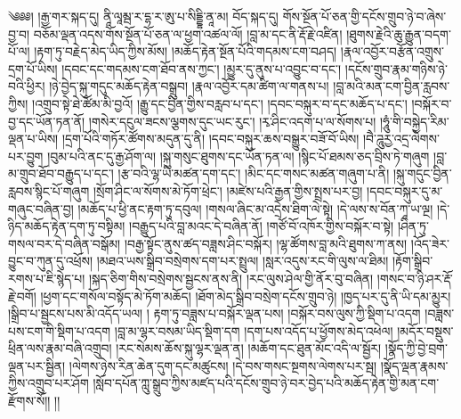 ༄༅༅། །རྒྱ་གར་སྐད་དུ། ནཱི་ལཱམྦ་ར་དྷ་ར་ཨུ་པ་སིདྡྷི་ནཱ་མ། བོད་སྐད་དུ། གོས་སྔོན་པོ་ཅན་གྱི་དངོས་གྲུབ་ཉེ་བ་ཞེས་བྱ་བ། བཅོམ་ལྡན་འདས་གོས་སྔོན་པོ་ཅན་ལ་ཕྱག་འཚལ་ལོ། །བླ་མ་དང་ནི་རྡོ་རྗེ་འཛིན། །ཐུགས་རྗེའི་ཆུ་རྒྱུན་བདག་པོ་ལ། །རྟག་ཏུ་བརྗེད་མེད་ཡིད་ཀྱིས་མོས། །མཆོད་རྟེན་སྔོན་པོའི་གདམས་ངག་བཤད། །རྣལ་འབྱོར་བརྩོན་འགྲུས་དྲག་པོ་ཡིས། །དབང་དང་གདམས་ངག་ཐོབ་ནས་ཀྱང་། །མྱུར་དུ་ནུས་པ་འབྱུང་བ་དང་། །དངོས་གྲུབ་རྣམ་གཉིས་ཉེ་བའི་ཕྱིར། །ཉེ་བྱེད་སྐུ་གདུང་མཆོད་རྟེན་བསྒྲུབ། །རྣལ་འབྱོར་དམ་ཚིག་ལ་གནས་པ། །བླ་མའི་མན་ངག་བྱིན་རླབས་ཀྱིས། །འགྲུབ་སྟེ་ཐེ་ཚོམ་མི་བྱའོ། །རྒྱུ་དང་བྱིན་གྱིས་བརླབ་པ་དང་། །དབང་བསྐུར་བ་དང་མཆོད་པ་དང་། །བསྐོར་བ་བྱ་དང་ཡོན་ཏན་ནོ། །གསེར་དངུལ་ཟངས་ལྕགས་དུང་ཡང་རུང་། །རྭ་ཤིང་འདག་པ་ལ་སོགས་པ། །ཧཱུཾ་གི་བསྐྱེད་རིམ་ལྡན་པ་ཡིས། །དྲག་པོའི་གཏོར་ཚོགས་མདུན་དུ་ནི། །དབང་བསྐུར་ཆས་བསྒྱུར་བཟོ་བོ་ཡིས། །བཻ་ཌཱུརྱ་འདྲ་ལེགས་པར་བྱུག །བུམ་པའི་ནང་དུ་རྒྱ་ཤོག་ལ། །སྐུ་གསུང་ཐུགས་དང་ཡོན་ཏན་ལ། །སྙིང་པོ་ཐམས་ཅད་བྲིས་ཏེ་གཞུག །བླ་མ་གྲུབ་ཐོབ་བརྒྱུད་པ་དང་། །རྩ་བའི་ལྷ་ཡི་མཚན་དག་དང་། །མིང་དང་གསང་མཚན་གཞུག་པ་ནི། །སྐུ་གདུང་བྱིན་རླབས་སྙིང་པོ་གཞུག །སྲོག་ཤིང་ལ་སོགས་མེ་ཏོག་ཕྲེང་། །མཛེས་པའི་རྒྱན་གྱིས་སྤྲས་པར་བྱ། །དབང་བསྐུར་དུ་མ་གཞུང་བཞིན་བྱ། །མཆོད་པ་ཕྱི་ནང་རྟག་ཏུ་དབུལ། །གསལ་ཞིང་མ་འདྲེས་ཐིག་ལེ་སྟེ། །དེ་ལས་ས་བོན་ཀཱ་ཡ་ལྔ། །དེ་ཉིད་མཆོད་རྟེན་དག་ཏུ་བསྟིམ། །བརྒྱུད་པའི་བླ་མའང་དེ་བཞིན་ནོ། །གཙོ་བོ་འཁོར་གྱིས་བསྐོར་བ་སྟེ། །ཤིན་ཏུ་གསལ་བར་དེ་བཞིན་བསྒོམ། །བརྒྱ་སྟོང་ནུས་ཚད་བཟླས་ཤིང་བསྐོར། །ལྷ་ཚོགས་བླ་མའི་ཐུགས་ཀ་ནས། །འོད་ཟེར་བྱུང་བ་ཀུན་དུ་འཕྲོས། །མཐའ་ཡས་སྒྲིབ་བསྲེགས་དག་པར་སྤྲུལ། །སླར་འདུས་རང་གི་ལུས་ལ་ཐིམ། །རྟོག་སྒྲིབ་རགས་པ་ཇི་སྙེད་པ། །སྐད་ཅིག་གིས་བསྲེགས་སྦྱངས་ནས་ནི། །རང་ལུས་ཤེལ་གྱི་ནོར་བུ་བཞིན། །གསང་བ་ཉི་ཤར་རྡོ་རྗེ་བགོ། །ཕྱག་དང་གསོལ་བསྟོད་མེ་ཏོག་མཆོད། །ཐོག་མེད་སྒྲིབ་བསྲེག་དངོས་གྲུབ་ཉེ། །ཁྱད་པར་དུ་ནི་ཡི་དམ་མྱུར། །སྒྲིབ་པ་སྦྱངས་པས་མི་འདོད་ཡལ། །
རྟག་ཏུ་བཟླས་པ་བསྐོར་ལྡན་པས། །བསྐོར་བས་ལུས་ཀྱི་སྡིག་པ་འདག །བཟླས་པས་ངག་གི་སྡིག་པ་འདག །བླ་མ་ལྷར་བསམ་ཡིད་སྡིག་དག །དག་པས་འདོད་པ་ཕྱོགས་མེད་འཕེལ། །མདོར་བསྡུས་ཕྲིན་ལས་རྣམ་བཞི་འགྲུབ། །རང་སེམས་ཆོས་སྐུ་ལྷར་ལྡན་ན། །མཆོག་དང་ཐུན་མོང་འདི་ལ་སྦྱོར། །སྣོད་ཀྱི་བྱེ་བྲག་ལྡན་པར་སྦྱིན། །ལེགས་ཉེས་རིན་ཆེན་དུག་དང་མཚུངས། །དེ་བས་གསང་སྔགས་ལེགས་པར་སྦ། །སྣོད་ལྡན་རྣམས་ཀྱིས་འགྲུབ་པར་ཤོག །སློབ་དཔོན་ཀླུ་སྒྲུབ་ཀྱིས་མཛད་པའི་དངོས་གྲུབ་ཉེ་བར་བྱེད་པའི་མཆོད་རྟེན་གྱི་མན་ངག་རྫོགས་སོ།། །།